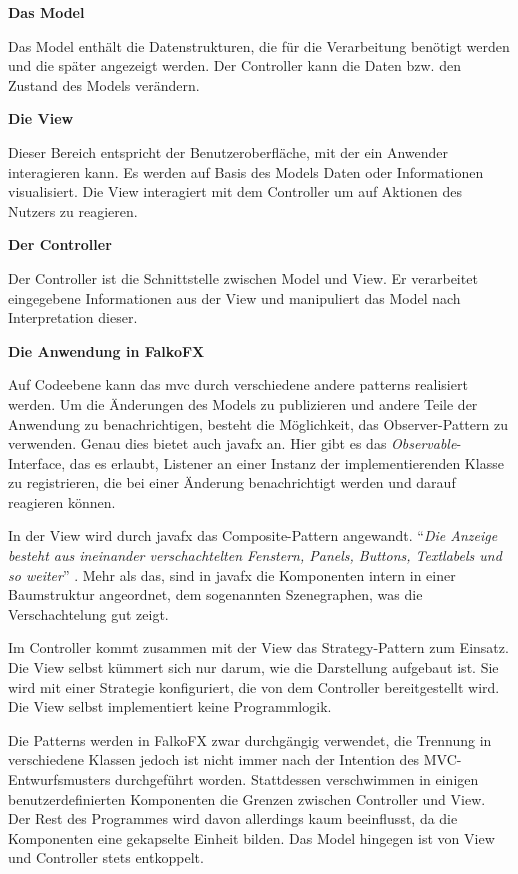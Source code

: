 \textbf{Das Model}

Das Model enthält die Datenstrukturen, die für die Verarbeitung benötigt werden und die später angezeigt werden. Der Controller kann die Daten bzw. den Zustand des Models verändern. \cite[S. 529ff.]{Freeman2006}

\textbf{Die View}

Dieser Bereich entspricht der Benutzeroberfläche, mit der ein Anwender interagieren kann. Es werden auf Basis des Models Daten oder Informationen visualisiert. Die View interagiert mit dem Controller um auf Aktionen des Nutzers zu reagieren. \cite[S. 529ff.]{Freeman2006}

\textbf{Der Controller}

Der Controller ist die Schnittstelle zwischen Model und View. Er verarbeitet eingegebene Informationen aus der View und manipuliert das Model nach Interpretation dieser. \cite[S. 529ff.]{Freeman2006}

\textbf{Die Anwendung in FalkoFX}

Auf Codeebene kann das \gls{mvc} durch verschiedene andere \gls{pattern}s realisiert werden.
Um die Änderungen des Models zu publizieren und andere Teile der Anwendung zu benachrichtigen, besteht die Möglichkeit, das Observer-Pattern zu verwenden. Genau dies bietet auch \gls{javafx} an. Hier gibt es das \textit{Observable}-Interface, das es erlaubt, Listener an einer Instanz der implementierenden Klasse zu registrieren, die bei einer Änderung benachrichtigt werden und darauf reagieren können.

In der View wird durch \gls{javafx} das Composite-Pattern angewandt. \enquote{\textit{Die Anzeige besteht aus ineinander verschachtelten Fenstern, Panels, Buttons, Textlabels und so weiter}} \cite[S. 532]{Freeman2006}. Mehr als das, sind in \gls{javafx} die Komponenten intern in einer Baumstruktur angeordnet, dem sogenannten Szenegraphen, was die Verschachtelung gut zeigt.

Im Controller kommt zusammen mit der View das Strategy-Pattern zum Einsatz. Die View selbst kümmert sich nur darum, wie die Darstellung aufgebaut ist. Sie wird mit einer Strategie konfiguriert, die von dem Controller bereitgestellt wird. Die View selbst implementiert keine Programmlogik.

Die Patterns werden in FalkoFX zwar durchgängig verwendet, die Trennung in verschiedene Klassen jedoch ist nicht immer nach der Intention des MVC-Entwurfsmusters durchgeführt worden. Stattdessen verschwimmen in einigen benutzerdefinierten Komponenten die Grenzen zwischen Controller und View. Der Rest des Programmes wird davon allerdings kaum beeinflusst, da die Komponenten eine gekapselte Einheit bilden. Das Model hingegen ist von View und Controller stets entkoppelt.
